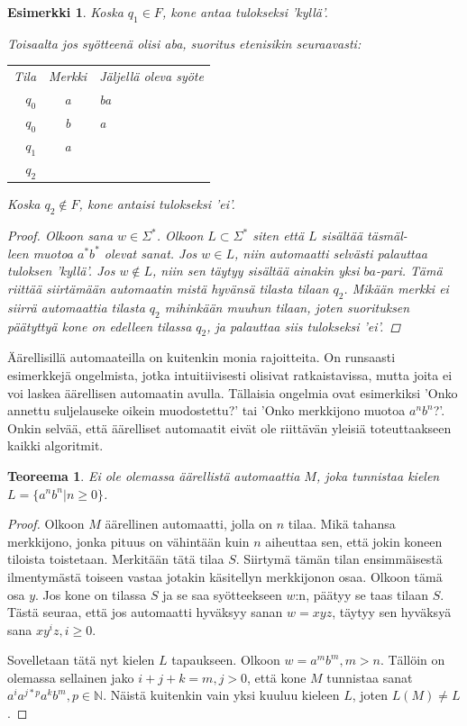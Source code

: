 \documentclass[a4paper, 12pt]{article}
\newtheorem{teor}{Teoreema}
\newtheorem{example}{Esimerkki}
\begin{document}
\begin{example}
Koska $q_1 \in F$, kone antaa tulokseksi 'kyllä'.

Toisaalta jos syötteenä olisi aba, suoritus etenisikin seuraavasti:
\\
\begin{center}
\begin{tabular}{r c l }
Tila & Merkki & Jäljellä oleva syöte \\
$q_0$ & a & ba \\
$q_0$ & b & a \\
$q_1$ & a &  \\
$q_2$ & & \\
\end{tabular}
\end{center}

Koska $q_2 \notin F$, kone antaisi tulokseksi 'ei'.

\begin{proof}
Olkoon sana $w \in \Sigma^*$. Olkoon $L \subset \Sigma^*$ siten että $L$ sisältää täsmäl-\\leen muotoa $a^*b^*$ olevat sanat. Jos $w \in L$, niin automaatti selvästi palauttaa tuloksen 'kyllä'. Jos $w \notin L$, niin sen täytyy sisältää ainakin yksi $ba$-pari. Tämä riittää siirtämään automaatin mistä hyvänsä tilasta tilaan $q_2$. Mikään merkki ei siirrä automaattia tilasta $q_2$ mihinkään muuhun tilaan, joten suorituksen päätyttyä kone on edelleen tilassa $q_2$, ja palauttaa siis tulokseksi 'ei'.
\qedhere
\end{proof}
\end{example}

Äärellisillä automaateilla on kuitenkin monia rajoitteita. On runsaasti esimerkkejä ongelmista, jotka intuitiivisesti olisivat ratkaistavissa, mutta joita ei voi laskea äärellisen automaatin avulla. Tällaisia ongelmia ovat esimerkiksi 'Onko annettu suljelauseke oikein muodostettu?' tai 'Onko merkkijono muotoa $a^nb^n$?'. Onkin selvää, että äärelliset automaatit eivät ole riittävän yleisiä toteuttaakseen kaikki algoritmit.

\begin{teor}
Ei ole olemassa äärellistä automaattia $M$, joka tunnistaa kielen $L = \{a^nb^n | n \geq 0\}$.
\end{teor}
\begin{proof}
Olkoon $M$ äärellinen automaatti, jolla on $n$ tilaa. Mikä tahansa merkkijono, jonka pituus on vähintään kuin $n$ aiheuttaa sen, että jokin koneen tiloista toistetaan. Merkitään tätä tilaa $S$. Siirtymä tämän tilan ensimmäisestä ilmentymästä toiseen vastaa jotakin käsitellyn merkkijonon osaa. Olkoon tämä osa $y$. Jos kone on tilassa $S$ ja se saa syötteekseen $w$:n, päätyy se taas tilaan $S$. Tästä seuraa, että jos automaatti hyväksyy sanan $w = xyz$, täytyy sen hyväksyä sana $xy^iz, i \geq 0$.

Sovelletaan tätä nyt kielen $L$ tapaukseen. Olkoon $w = a^mb^m, m > n$. Tällöin on olemassa sellainen jako $i + j + k = m, j > 0$, että kone $M$ tunnistaa sanat $a^ia^{j*p}a^kb^m, p \in \mathbb{N}$. Näistä kuitenkin vain yksi kuuluu kieleen $L$, joten $L(M) \neq L$.
\qedhere
\end{proof}
\end{document}

